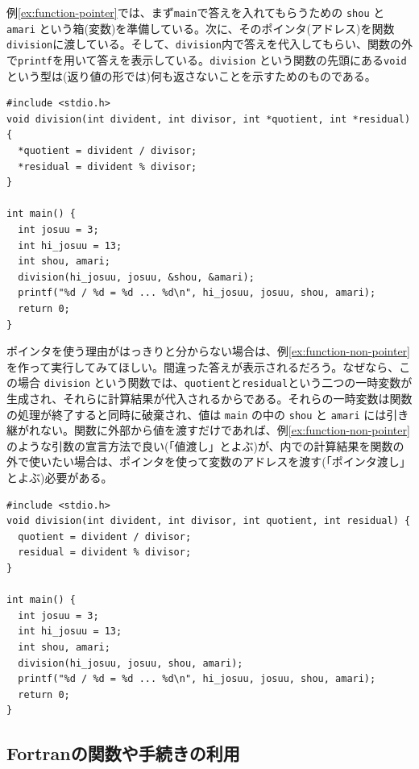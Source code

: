 例\ref{ex:function-pointer}では、まず{\tt main}で答えを入れてもらうための \verb|shou| と \verb|amari| という箱(変数)を準備している。次に、そのポインタ(アドレス)を関数\verb|division|に渡している。そして、\verb|division|内で答えを代入してもらい、関数の外で\verb|printf|を用いて答えを表示している。\verb|division| という関数の先頭にある\verb|void|という型は(返り値の形では)何も返さないことを示すためのものである。
%
\begin{reidai}\label{ex:function-pointer}
\begin{verbatim}
#include <stdio.h>
void division(int divident, int divisor, int *quotient, int *residual) {
  *quotient = divident / divisor;
  *residual = divident % divisor;
}

int main() {
  int josuu = 3;
  int hi_josuu = 13;
  int shou, amari;
  division(hi_josuu, josuu, &shou, &amari);
  printf("%d / %d = %d ... %d\n", hi_josuu, josuu, shou, amari);
  return 0;
}
\end{verbatim}
\end{reidai} \noindent
%
ポインタを使う理由がはっきりと分からない場合は、例\ref{ex:function-non-pointer}を作って実行してみてほしい。間違った答えが表示されるだろう。なぜなら、この場合 \verb|division| という関数では、\verb|quotient|と\verb|residual|という二つの一時変数が生成され、それらに計算結果が代入されるからである。それらの一時変数は関数の処理が終了すると同時に破棄され、値は \verb|main| の中の \verb|shou| と \verb|amari| には引き継がれない。関数に外部から値を渡すだけであれば、例\ref{ex:function-non-pointer}のような引数の宣言方法で良い(「値渡し」とよぶ)が、内での計算結果を関数の外で使いたい場合は、ポインタを使って変数のアドレスを渡す(「ポインタ渡し」とよぶ)必要がある。
%
\begin{reidai}\label{ex:function-non-pointer}
\begin{verbatim}
#include <stdio.h>
void division(int divident, int divisor, int quotient, int residual) {
  quotient = divident / divisor;
  residual = divident % divisor;
}

int main() {
  int josuu = 3;
  int hi_josuu = 13;
  int shou, amari;
  division(hi_josuu, josuu, shou, amari);
  printf("%d / %d = %d ... %d\n", hi_josuu, josuu, shou, amari);
  return 0;
}
\end{verbatim}
\end{reidai}
%

\subsection {Fortranの関数や手続きの利用}

